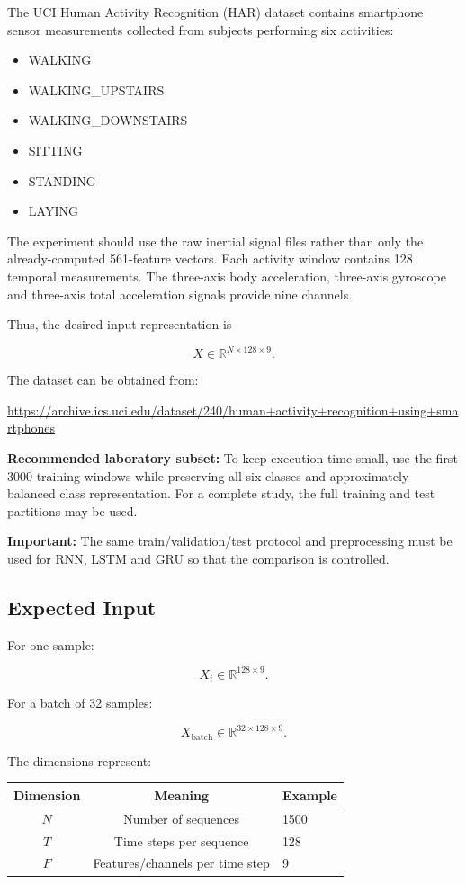 \documentclass[10pt]{article}
\begin{document}
The UCI Human Activity Recognition (HAR) dataset contains smartphone sensor
measurements collected from subjects performing six activities:

\begin{itemize}
\item WALKING
\item WALKING\_UPSTAIRS
\item WALKING\_DOWNSTAIRS
\item SITTING
\item STANDING
\item LAYING
\end{itemize}

The experiment should use the raw inertial signal files rather than only the
already-computed 561-feature vectors. Each activity window contains 128
temporal measurements. The three-axis body acceleration, three-axis
gyroscope and three-axis total acceleration signals provide nine channels.

Thus, the desired input representation is

\[
X\in\mathbb{R}^{N\times128\times9}.
\]

The dataset can be obtained from:

\url{https://archive.ics.uci.edu/dataset/240/human+activity+recognition+using+smartphones}

\textbf{Recommended laboratory subset:} To keep execution time small, use
the first 3000 training windows while preserving all six classes and
approximately balanced class representation. For a complete study, the full
training and test partitions may be used.

\textbf{Important:} The same train/validation/test protocol and preprocessing
must be used for RNN, LSTM and GRU so that the comparison is controlled.

\subsection*{Expected Input}

For one sample:

\[
X_i\in\mathbb{R}^{128\times9}.
\]

For a batch of 32 samples:

\[
X_{\mathrm{batch}}\in\mathbb{R}^{32\times128\times9}.
\]

The dimensions represent:

\begin{center}
\begin{tabular}{|c|c|l|}
\hline
Dimension & Meaning & Example\\
\hline
$N$ & Number of sequences & 1500\\
$T$ & Time steps per sequence & 128\\
$F$ & Features/channels per time step & 9\\
\hline
\end{tabular}
\end{center}
\end{document}
